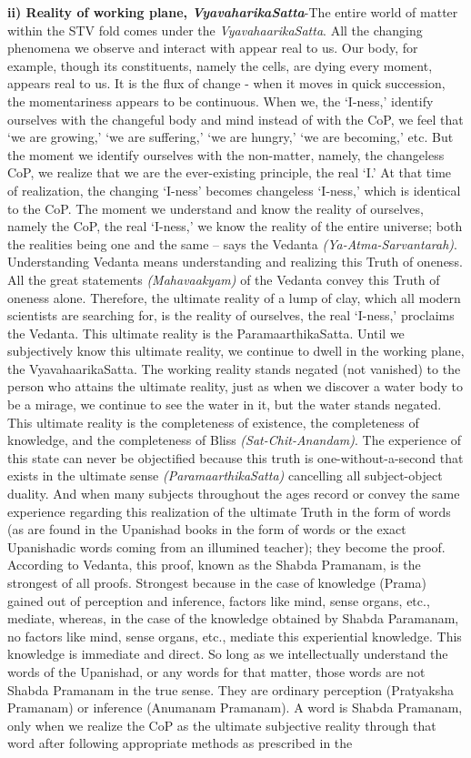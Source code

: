 \documentclass[twoside, 13pt]{article}
\begin{document}
{{\textbf{ii) Reality of working plane, \textit{VyavaharikaSatta}}-The entire world of matter within the STV fold comes under the \textit{VyavahaarikaSatta}. All the changing phenomena we observe and interact with appear real to us. Our body, for example, though its constituents, namely the cells, are dying every moment, appears real to us. It is the flux of change - when it moves in quick succession, the momentariness appears to be continuous. When we, the ‘I-ness,’ identify ourselves with the changeful body and mind instead of with the CoP, we feel that ‘we are growing,’ ‘we are suffering,’ ‘we are hungry,’ ‘we are becoming,’ etc. But the moment we identify ourselves with the non-matter, namely, the changeless CoP, we realize that we are the ever-existing principle, the real ‘I.’ At that time of realization, the changing ‘I-ness’ becomes changeless ‘I-ness,’ which is identical to the CoP. The moment we understand and know the reality of ourselves, namely the CoP, the real ‘I-ness,’ we know the reality of the entire universe; both the realities being one and the same – says the Vedanta \textit{(Ya-Atma-Sarvantarah)}. Understanding Vedanta means understanding and realizing this Truth of oneness. All the great statements \textit{(Mahavaakyam)} of the Vedanta convey this Truth of oneness alone. Therefore, the ultimate reality of a lump of clay, which all modern scientists are searching for, is the reality of ourselves, the real ‘I-ness,’ proclaims the Vedanta. This ultimate reality is the ParamaarthikaSatta. Until we subjectively know this ultimate reality, we continue to dwell in the working plane, the VyavahaarikaSatta. The working reality stands negated (not vanished) to the person who attains the ultimate reality, just as when we discover a water body to be a mirage, we continue to see the water in it, but the water stands negated. This ultimate reality is the completeness of existence, the completeness of knowledge, and the completeness of Bliss \textit{(Sat-Chit-Anandam)}. The experience of this state can never be objectified because this truth is one-without-a-second that exists in the ultimate sense \textit{(ParamaarthikaSatta)} cancelling all subject-object duality. And when many subjects throughout the ages record or convey the same experience regarding this realization of the ultimate Truth in the form of words (as are found in the Upanishad books in the form of words or the exact Upanishadic words coming from an illumined teacher); they become the proof. According to Vedanta, this proof, known as the Shabda Pramanam, is the strongest of all proofs. Strongest because in the case of knowledge (Prama) gained out of perception and inference, factors like mind, sense organs, etc., mediate, whereas, in the case of the knowledge obtained by Shabda Paramanam, no factors like mind, sense organs, etc., mediate this experiential knowledge. This knowledge is immediate and direct. So long as we intellectually understand the words of the Upanishad, or any words for that matter, those words are not Shabda Pramanam in the true sense. They are ordinary perception (Pratyaksha Pramanam) or inference (Anumanam Pramanam). A word is Shabda Pramanam, only when we realize the CoP as the ultimate subjective reality through that word after following appropriate methods as prescribed in the }}
\end{document}

